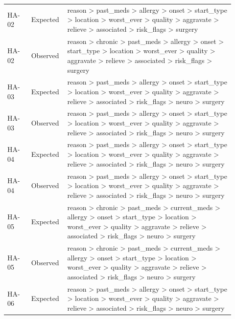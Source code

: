 \begin{longtable}{>{\raggedright\arraybackslash}p{0.1\linewidth}>{\raggedright\arraybackslash}p{0.12\linewidth}>{\raggedright\arraybackslash}p{0.7\linewidth}}
HA-\allowbreak{}02 & Expected & reason > past\_\allowbreak{}meds > allergy > onset > start\_\allowbreak{}type > location > worst\_\allowbreak{}ever > quality > aggravate > relieve > associated > risk\_\allowbreak{}flags > surgery \\
HA-\allowbreak{}02 & Observed & reason > chronic > past\_\allowbreak{}meds > allergy > onset > start\_\allowbreak{}type > location > worst\_\allowbreak{}ever > quality > aggravate > relieve > associated > risk\_\allowbreak{}flags > surgery \\
HA-\allowbreak{}03 & Expected & reason > past\_\allowbreak{}meds > allergy > onset > start\_\allowbreak{}type > location > worst\_\allowbreak{}ever > quality > aggravate > relieve > associated > risk\_\allowbreak{}flags > neuro > surgery \\
HA-\allowbreak{}03 & Observed & reason > past\_\allowbreak{}meds > allergy > onset > start\_\allowbreak{}type > location > worst\_\allowbreak{}ever > quality > aggravate > relieve > associated > risk\_\allowbreak{}flags > neuro > surgery \\
HA-\allowbreak{}04 & Expected & reason > past\_\allowbreak{}meds > allergy > onset > start\_\allowbreak{}type > location > worst\_\allowbreak{}ever > quality > aggravate > relieve > associated > risk\_\allowbreak{}flags > neuro > surgery \\
HA-\allowbreak{}04 & Observed & reason > past\_\allowbreak{}meds > allergy > onset > start\_\allowbreak{}type > location > worst\_\allowbreak{}ever > quality > aggravate > relieve > associated > risk\_\allowbreak{}flags > neuro > surgery \\
HA-\allowbreak{}05 & Expected & reason > chronic > past\_\allowbreak{}meds > current\_\allowbreak{}meds > allergy > onset > start\_\allowbreak{}type > location > worst\_\allowbreak{}ever > quality > aggravate > relieve > associated > risk\_\allowbreak{}flags > neuro > surgery \\
HA-\allowbreak{}05 & Observed & reason > chronic > past\_\allowbreak{}meds > current\_\allowbreak{}meds > allergy > onset > start\_\allowbreak{}type > location > worst\_\allowbreak{}ever > quality > aggravate > relieve > associated > risk\_\allowbreak{}flags > neuro > surgery \\
HA-\allowbreak{}06 & Expected & reason > past\_\allowbreak{}meds > allergy > onset > start\_\allowbreak{}type > location > worst\_\allowbreak{}ever > quality > aggravate > relieve > associated > risk\_\allowbreak{}flags > neuro > surgery \\

\end{longtable}
